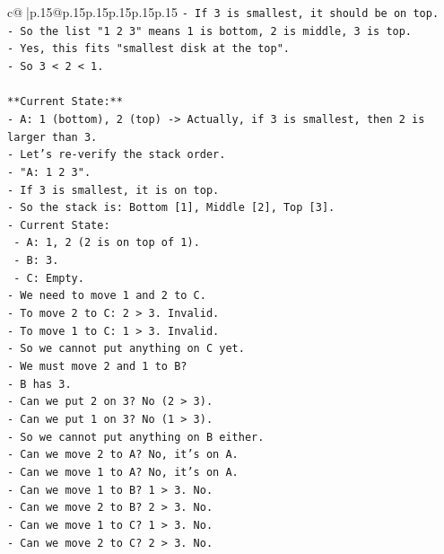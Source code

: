 \documentclass{article}
\begin{document}
{\begin{supertabular}{c@{$\;$}|p{.15\linewidth}@{}p{.15\linewidth}p{.15\linewidth}p{.15\linewidth}p{.15\linewidth}p{.15\linewidth}}
{{{\texttt{{-} If 3 is smallest, it should be on top.} \\
\texttt{{-} So the list "1 2 3" means 1 is bottom, 2 is middle, 3 is top.} \\
\texttt{{-} Yes, this fits "smallest disk at the top".} \\
\texttt{{-} So 3 < 2 < 1.} \\
\\ 
\texttt{**Current State:**} \\
\texttt{{-} A: 1 (bottom), 2 (top) {-}> Actually, if 3 is smallest, then 2 is larger than 3.} \\
\texttt{{-} Let's re{-}verify the stack order.} \\
\texttt{{-} "A: 1 2 3".} \\
\texttt{{-} If 3 is smallest, it is on top.} \\
\texttt{{-} So the stack is: Bottom {[}1{]}, Middle {[}2{]}, Top {[}3{]}.} \\
\texttt{{-} Current State:} \\
\texttt{  {-} A: 1, 2 (2 is on top of 1).} \\
\texttt{  {-} B: 3.} \\
\texttt{  {-} C: Empty.} \\
\texttt{{-} We need to move 1 and 2 to C.} \\
\texttt{{-} To move 2 to C: 2 > 3. Invalid.} \\
\texttt{{-} To move 1 to C: 1 > 3. Invalid.} \\
\texttt{{-} So we cannot put anything on C yet.} \\
\texttt{{-} We must move 2 and 1 to B?} \\
\texttt{{-} B has 3.} \\
\texttt{{-} Can we put 2 on 3? No (2 > 3).} \\
\texttt{{-} Can we put 1 on 3? No (1 > 3).} \\
\texttt{{-} So we cannot put anything on B either.} \\
\texttt{{-} Can we move 2 to A? No, it's on A.} \\
\texttt{{-} Can we move 1 to A? No, it's on A.} \\
\texttt{{-} Can we move 1 to B? 1 > 3. No.} \\
\texttt{{-} Can we move 2 to B? 2 > 3. No.} \\
\texttt{{-} Can we move 1 to C? 1 > 3. No.} \\
\texttt{{-} Can we move 2 to C? 2 > 3. No.} \\
\\ 
}}}
\end{supertabular}}
\end{document}
